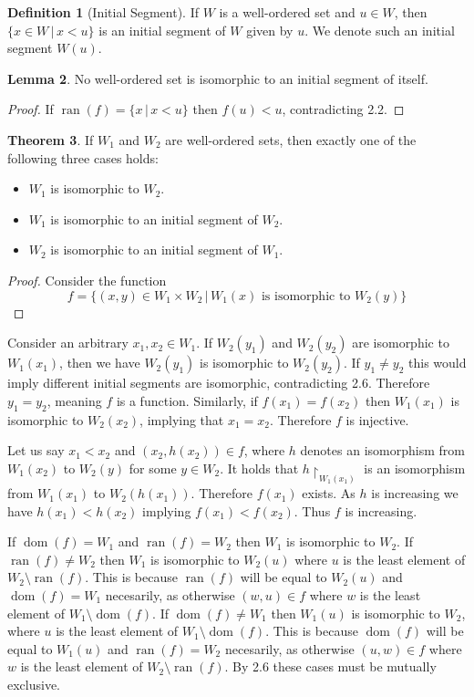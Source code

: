 \documentclass{article}
\theoremstyle{definition}
\newtheorem{thm}{Theorem}[section]
\newtheorem{defn}[thm]{Definition}
\newtheorem{lmma}[thm]{Lemma}
\DeclareMathOperator{\ran}{ran}
\DeclareMathOperator{\dom}{dom}
\begin{document}
\begin{defn}[Initial Segment]
    If $W$ is a well-ordered set and $u \in W$, then $\{x \in W \, | \, x < u\}$ is an initial segment of $W$ given by $u$. We denote such an initial segment $W(u)$.
\end{defn}

\begin{lmma}
    No well-ordered set is isomorphic to an initial segment of itself. 
\end{lmma}

\begin{proof}
    If $\ran(f) = \{x \, | \, x < u\}$ then $f(u) < u$, contradicting 2.2.
\end{proof}

\newpage

\begin{thm}
    If $W_1$ and $W_2$ are well-ordered sets, then exactly one of the following three cases holds:
    \begin{itemize}
        \item $W_1$ is isomorphic to $W_2$.
        \item $W_1$ is isomorphic to an initial segment of $W_2$.
        \item $W_2$ is isomorphic to an initial segment of $W_1$.
    \end{itemize}
    \begin{proof}
        Consider the function 
        \[
            f = \{(x, y)  \in W_1 \times W_2 \, | \, W_1(x) \text{ is isomorphic to } W_2(y) \}    
        \]
    \end{proof}
    Consider an arbitrary $x_1,  x_2 \in W_1$. If $W_2(y_1)$ and $W_2(y_2)$ are isomorphic to $W_1(x_1)$, then we have $W_2(y_1)$ is isomorphic to $W_2(y_2)$. If $y_1 \ne y_2$ this would imply different initial segments are isomorphic, contradicting 2.6. Therefore $y_1 = y_2$, meaning $f$ is a function. Similarly, if $f(x_1) = f(x_2)$ then $W_1(x_1)$ is isomorphic to $W_2(x_2)$, implying that $x_1 = x_2$. Therefore $f$ is injective. 

    Let us say $x_1 < x_2$ and $(x_2, h(x_2)) \in f$, where $h$ denotes an isomorphism from $W_1(x_2)$ to $W_2(y)$ for some $y \in W_2$. It holds that $h \restriction_{W_1(x_1)}$ is an isomorphism from $W_1(x_1)$ to $W_2(h(x_1))$. Therefore $f(x_1)$ exists. As $h$ is increasing we have $h(x_1) < h(x_2)$ implying $f(x_1) < f(x_2)$. Thus $f$ is increasing.

    If $\dom(f) = W_1$ and $\ran(f) = W_2$ then $W_1$ is isomorphic to $W_2$. If $\ran(f) \ne W_2$ then $W_1$ is isomorphic to $W_2(u)$ where $u$ is the least element of $W_2 \setminus \ran(f)$. This is because $\ran(f)$ will be equal to $W_2(u)$ and $\dom(f) = W_1$ necesarily, as otherwise $(w, u) \in f$ where $w$ is the least element of $W_1 \setminus \dom(f)$. If $\dom(f) \ne W_1$ then $W_1(u)$ is isomorphic to $W_2$, where $u$ is the least element of $W_1 \setminus \dom(f)$. This is because $\dom(f)$ will be equal to $W_1(u)$ and $\ran(f) = W_2$ necesarily, as otherwise $(u, w) \in f$ where $w$ is the least element of $W_2 \setminus \ran(f)$. By 2.6 these cases must be mutually exclusive.
\end{thm}
\end{document}
